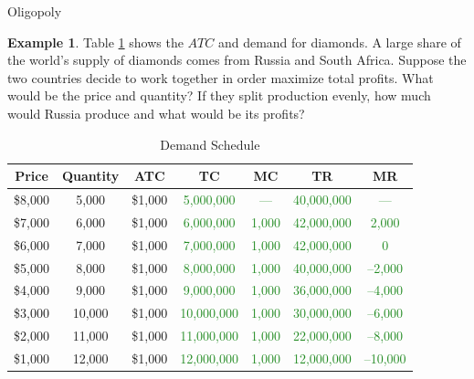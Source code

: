 \documentclass[xcolor={dvipsnames},pdf, hyperref={colorlinks=true, citecolor=ForestGreen, linkcolor=BlueViolet, urlcolor=Magenta}, handout]{beamer}
\theoremstyle{definition}
\newtheorem{exmp}{Example}[section]
\newcommand{\ddp}[1]{{\textcolor{ForestGreen}{#1}}}
\begin{document}
\begin{frame}{Oligopoly}
	\scriptsize
\begin{exmp} Table \ref{diamonds} shows the $ATC$ and demand for diamonds. A large share of the world's supply of diamonds comes from Russia and South Africa. Suppose the two countries decide to work together in order maximize total profits. What would be the price and quantity? If they split production evenly, how much would Russia produce and what would be its profits?
	
		\begin{table}[H]
		\centering
		\caption{Demand Schedule}
		\label{diamonds}
		\begin{tabular}{  c| c | c | c| c| c| c}        
			
			Price & Quantity & ATC & TC & MC & TR &  MR  \\
			\hline
			\$8,000 & 5,000 & \$1,000 & \ddp{5,000,000} & \ddp{---} & \ddp{40,000,000} & \ddp{---}\\
			\$7,000 & 6,000 & \$1,000  & \ddp{6,000,000} & \ddp{1,000} & \ddp{42,000,000} & \ddp{2,000}\\
			\$6,000 & 7,000 & \$1,000  & \ddp{7,000,000} & \ddp{1,000} & \ddp{42,000,000} & \ddp{0}\\
			\$5,000 & 8,000 & \$1,000  & \ddp{8,000,000} & \ddp{1,000} & \ddp{40,000,000} & \ddp{--2,000}\\
			\$4,000 & 9,000 & \$1,000 & \ddp{9,000,000} & \ddp{1,000} & \ddp{36,000,000} & \ddp{--4,000}\\
			\$3,000 & 10,000 & \$1,000 & \ddp{10,000,000} & \ddp{1,000} & \ddp{30,000,000} & \ddp{--6,000}\\
			\$2,000 & 11,000 & \$1,000 & \ddp{11,000,000} & \ddp{1,000} & \ddp{22,000,000} & \ddp{--8,000}\\
			\$1,000 & 12,000 & \$1,000  & \ddp{12,000,000} & \ddp{1,000} & \ddp{12,000,000} & \ddp{--10,000}\\
			
		\end{tabular}
	\end{table} 
	
\pause	\ddp{Under collusion, countries act as a monopolist and produce as long as $MR\ge MC$. $Q^* = 6,000$ at $P^* = 7,000$. $\Pi = (7,000 - 1,000) \times 3,000 = \$18$M for each nation.}

	
\end{exmp}
\end{frame}
\end{document}
